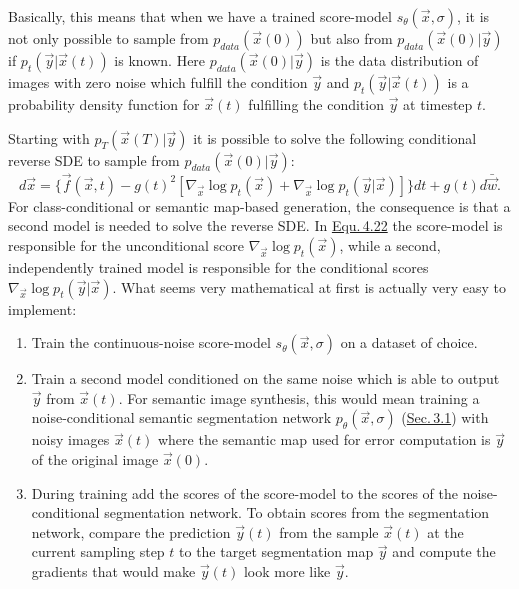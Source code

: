 Basically, this means that when we have a trained score-model $s_\theta(\vec{x}, \sigma)$, it is not only possible to sample from $p_{data}(\vec{x}(0))$ but also from $p_{data}(\vec{x}(0)|\vec{y})$ if $p_t(\vec{y}|\vec{x}(t))$ is known. Here $p_{data}(\vec{x}(0)|\vec{y})$ is the data distribution of images with zero noise which fulfill the condition $\vec{y}$ and $p_t(\vec{y}|\vec{x}(t))$ is a probability density function for $\vec{x}(t)$ fulfilling the condition $\vec{y}$ at timestep $t$.

Starting with $p_T(\vec{x}(T)|\vec{y})$ it is possible to solve the following conditional reverse SDE to sample from $p_{data}(\vec{x}(0)|\vec{y})$:
%
\begin{equation} \label{equ:4.22}
    d\vec{x}=\{\vec{f}(\vec{x},t)-g(t)^2[\nabla_{\vec{x}}\log p_t(\vec{x})+\nabla_{\vec{x}}\log p_t(\vec{y}|\vec{x})]\}dt+g(t)d\bar{\vec{w}}.
\end{equation}
%
For class-conditional or semantic map-based generation, the consequence is that a second model is needed to solve the reverse SDE. In \hyperref[equ:4.22]{Equ.\,4.22} the score-model is responsible for the unconditional score $\nabla_{\vec{x}}\log p_t(\vec{x})$, while a second, independently trained model is responsible for the conditional scores $\nabla_{\vec{x}}\log p_t(\vec{y}|\vec{x})$. What seems very mathematical at first is actually very easy to implement:
%
\begin{enumerate}
    \item Train the continuous-noise score-model $s_\theta(\vec{x},\sigma)$ on a dataset of choice.
    \item Train a second model conditioned on the same noise which is able to output $\vec{y}$ from $\vec{x}(t)$. For semantic image synthesis, this would mean training a noise-conditional semantic segmentation network $p_\theta(\vec{x}, \sigma)$ (\hyperref[sec:3.1]{Sec.\,3.1}) with noisy images $\vec{x}(t)$ where the semantic map used for error computation is $\vec{y}$ of the original image $\vec{x}(0)$.
    \item During training add the scores of the score-model to the scores of the noise-conditional segmentation network. To obtain scores from the segmentation network, compare the prediction $\vec{y}(t)$ from the sample $\vec{x}(t)$ at the current sampling step $t$ to the target segmentation map $\vec{y}$ and compute the gradients that would make $\vec{y}(t)$ look more like $\vec{y}$.
\end{enumerate}

